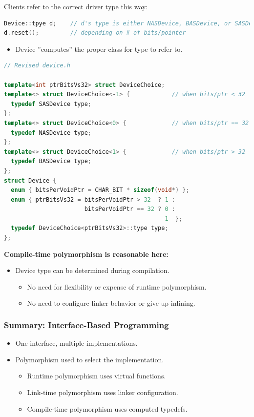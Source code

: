 Clients refer to the correct driver type this way:
\begin{lstlisting}[language=C++]
Device::tpye d;    // d's type is either NASDevice, BASDevice, or SASDevice,
d.reset();         // depending on # of bits/pointer
\end{lstlisting}
\begin{itemize}
  \item Device ''computes'' the proper class for type to refer to.
\end{itemize}
\begin{lstlisting}[language=C++]
// Revised device.h

template<int ptrBitsVs32> struct DeviceChoice;
template<> struct DeviceChoice<-1> {            // when bits/ptr < 32
  typedef SASDevice type;
};
template<> struct DeviceChoice<0> {             // when bits/ptr == 32
  typedef NASDevice type;
};
template<> struct DeviceChoice<1> {             // when bits/ptr > 32
  typedef BASDevice type;
};
struct Device {
  enum { bitsPerVoidPtr = CHAR_BIT * sizeof(void*) };
  enum { ptrBitsVs32 = bitsPerVoidPtr > 32  ? 1 :
                       bitsPerVoidPtr == 32 ? 0 :
                                             -1  };
  typedef DeviceChoice<ptrBitsVs32>::type type;
};
\end{lstlisting}

\textbf{Compile-time polymorphism is reasonable here:}
\begin{itemize}
  \item Device type can be determined during compilation.
  \begin{itemize}
    \item No need for flexibility or expense of runtime polymorphism.
    \item No need to configure linker behavior or give up inlining.
  \end{itemize}
\end{itemize}

\subsubsection{Summary: Interface-Based Programming}
\begin{itemize}
  \item One interface, multiple implementations.
  \item Polymorphism used to select the implementation.
  \begin{itemize}
    \item Runtime polymorphism uses virtual functions.
    \item Link-time polymorphism uses linker configuration.
    \item Compile-time polymorphism uses computed typedefs.
  \end{itemize}
\end{itemize}

